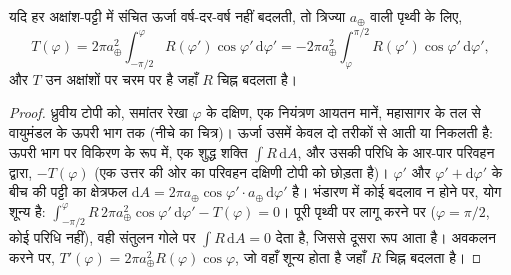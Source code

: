 \begin{proposition}[शुद्ध विकिरण से परिवहन]\label{prop:b1:radiation-heat-transport:mht}
यदि हर अक्षांश-पट्टी में संचित ऊर्जा वर्ष-दर-वर्ष नहीं बदलती, तो त्रिज्या $a_\oplus$ वाली पृथ्वी के लिए,
\[
  T(\varphi) = 2\pi a_\oplus^2\int_{-\pi/2}^{\varphi} R(\varphi')\cos\varphi'\,
  \mathrm d\varphi' = -2\pi a_\oplus^2\int_{\varphi}^{\pi/2} R(\varphi')\cos
  \varphi'\,\mathrm d\varphi' ,
\]
और $T$ उन अक्षांशों पर चरम पर है जहाँ $R$ चिह्न बदलता है।
\end{proposition}

\begin{proof}
ध्रुवीय टोपी को, समांतर रेखा $\varphi$ के दक्षिण, एक नियंत्रण आयतन मानें, महासागर के तल से
वायुमंडल के ऊपरी भाग तक (नीचे का चित्र)। ऊर्जा उसमें केवल दो तरीकों से आती या निकलती है:
ऊपरी भाग पर विकिरण के रूप में, एक शुद्ध शक्ति
$\int R\,\mathrm dA$, और उसकी परिधि के आर-पार परिवहन द्वारा, $-T(\varphi)$ (एक
उत्तर की ओर का परिवहन दक्षिणी टोपी को छोड़ता है)। $\varphi'$ और
$\varphi' + \mathrm d\varphi'$ के बीच की पट्टी का क्षेत्रफल $\mathrm dA = 2\pi a_\oplus\cos\varphi'
\cdot a_\oplus\,\mathrm d\varphi'$ है। भंडारण में कोई बदलाव न होने पर, योग शून्य है:
$\int_{-\pi/2}^{\varphi} R\,2\pi a_\oplus^2\cos\varphi'\,\mathrm d\varphi' -
T(\varphi) = 0$। पूरी पृथ्वी पर लागू करने पर ($\varphi = \pi/2$, कोई परिधि नहीं), वही
संतुलन गोले पर $\int R\,\mathrm dA = 0$ देता है, जिससे दूसरा रूप आता है।
अवकलन करने पर, $T'(\varphi) = 2\pi a_\oplus^2 R(\varphi)\cos\varphi$, जो
वहाँ शून्य होता है जहाँ $R$ चिह्न बदलता है।
\end{proof}

